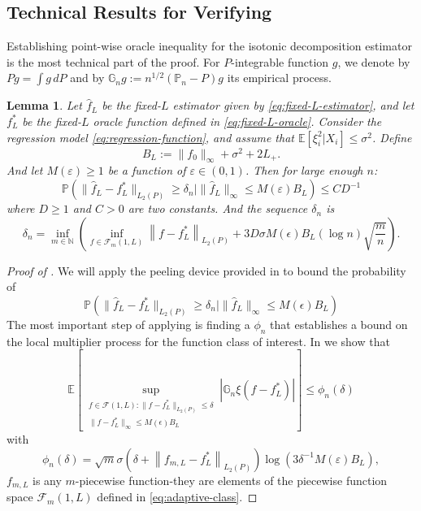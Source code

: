 \documentclass[12pt]{article}
\newtheorem{lemma}[theorem]{Lemma}
\begin{document}
\begin{appendices}
\subsection{Technical Results for Verifying }\label{app: oracle theorem fixed L}
Establishing point-wise oracle inequality for the isotonic decomposition estimator is the most technical part of the proof. For $P$-integrable function $g$, we denote by $Pg = \int g \, dP$ and by $\mathbb{G}_n g := n^{1/2}(\mathbb{P}_n -P)g$ its empirical process. 
\begin{lemma}
	\label{th: orcale theorem}
    Let $\widehat f_{L}$ be the fixed-$L$ estimator given by \eqref{eq:fixed-L-estimator}, and let $f^*_{L}$ be the fixed-$L$ oracle function defined in \eqref{eq:fixed-L-oracle}. Consider the regression model \eqref{eq:regression-function}, and assume that $\mathbb{E}[\xi_i^2 | X_i] \le \sigma^2$. Define
    \[
    B_L := \|f_0\|_{\infty} + \sigma^2 + 2L_+.
    \]
    And let $M(\varepsilon) \geq 1$ be a function of $\varepsilon\in (0,1)$. 
    Then for large enough $n$:
    \begin{equation*}
        \mathbb{P}\left(\|\widehat{f}_L-f_L^*\|_{L_2(P)} \geq \delta_n \mid\|\widehat{f}_L\|_{\infty} \leq M(\varepsilon) B_L\right) \leq CD^{-1}
    \end{equation*}
    where $D\geq 1$ and $C>0$ are two constants. And the sequence $\delta_n$ is
    \begin{equation*}
        \delta_n = \inf _{m \in \mathbb{N}}\left(\inf _{f \in \mathcal{F}_m(1, L)}\left\|f-f_L^*\right\|_{L_2(P)}+3D\sigma M(\epsilon) B_L (\log n)\sqrt{\frac{m}{n}}\right).
    \end{equation*}
\end{lemma}
\begin{proof}[Proof of ]
We will apply the peeling device provided in  to bound the probability of 
\begin{equation*}
    \mathbb{P}\left(\|\widehat{f}_L-f_L^*\|_{L_2(P)} \geq \delta_n \mid\|\widehat{f}_L\|_{\infty} \leq M(\epsilon) B_L\right)
\end{equation*}
The most important step of applying  is finding a $\phi_n$ that establishes a bound on the local multiplier process for the function class of interest. In  we show that 
\begin{equation*}
\mathbb{E}\left[\sup _{\substack{f \in \mathcal{F}(1, L):\|f-f_L^*\|_{L_2(P)} \leq \delta \\\|f-f_L^*\|_{\infty} \leq M(\epsilon) B_L}}\left|\mathbb{G}_n \xi\left(f-f_L^*\right)\right|\right] \leq \phi_n\left(\delta\right)
\end{equation*}
with
\begin{equation*}
\phi_n(\delta) = \sqrt{m} \sigma\left(\delta+\left\|f_{m, L}-f_L^*\right\|_{L_2(P)}\right) \log \left(3 \delta^{-1} M(\varepsilon) B_L\right),
\end{equation*}
$f_{m, L}$ is any $m$-piecewise function-they are elements of the piecewise function space $\mathcal{F}_m(1, L)$ defined in \eqref{eq:adaptive-class}.


\end{proof}
\end{appendices}
\end{document}

